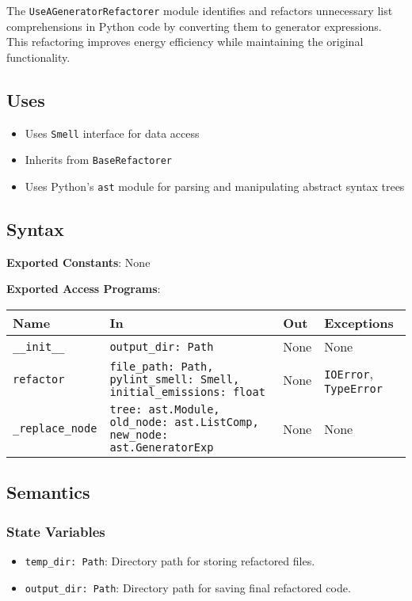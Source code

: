 \documentclass[12pt, titlepage]{article}
\begin{document}
The \texttt{UseAGeneratorRefactorer} module identifies and refactors 
unnecessary list comprehensions in Python code by converting them to generator expressions. This refactoring improves energy efficiency while maintaining the original functionality.

\subsection{Uses}
\begin{itemize}
  \item Uses \texttt{Smell} interface for data access
  \item Inherits from \texttt{BaseRefactorer}
  \item Uses Python's \texttt{ast} module for parsing and manipulating abstract syntax trees
\end{itemize}

\subsection{Syntax}
\noindent
\textbf{Exported Constants}: None

\noindent
\textbf{Exported Access Programs}:\\
\begin{tabularx}{\linewidth}{|
    l|
    >{\raggedright\arraybackslash}X|
    l|
    l|}
  \toprule Name & In & Out & Exceptions \\
  \midrule
  \texttt{\_\_init\_\_} & \texttt{output\_dir: Path} & None & None \\
  \hline
  \texttt{refactor} & \texttt{file\_path: Path, pylint\_smell: Smell, initial\_emissions: float} & None & \texttt{IOError}, \texttt{TypeError} \\
  \hline
  \texttt{\_replace\_node} & \texttt{tree: ast.Module, old\_node: ast.ListComp, new\_node: ast.GeneratorExp} & None & None \\
  \bottomrule
\end{tabularx}

\subsection{Semantics}

\subsubsection{State Variables}
\begin{itemize}
  \item \texttt{temp\_dir: Path}: Directory path for storing refactored files.
  \item \texttt{output\_dir: Path}: Directory path for saving final refactored code.
\end{itemize}
\end{document}

